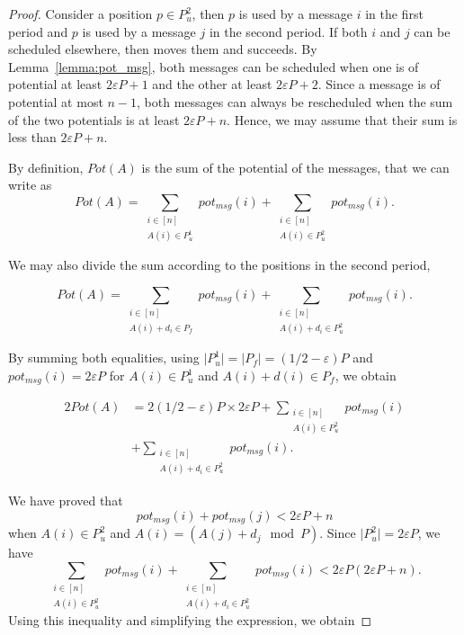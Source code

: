 \documentclass[pdflatex,sn-mathphys,iicol]{sn-jnl}%
\theoremstyle{thmstyleone}%
\theoremstyle{thmstyletwo}%
\theoremstyle{thmstylethree}%
\begin{document}
\begin{proof}
Consider a position $p \in P^2_u$, then $p$ is used by a message $i$ in the first period and $p$ is used by a message $j$ in the second period. If both $i$ and $j$ can be scheduled elsewhere, then \swapandmove moves them and succeeds. 
By Lemma~\ref{lemma:pot_msg}, both messages can be scheduled when one is of potential at least $2\varepsilon P + 1$ and the other at least $2\varepsilon P + 2$. 
Since a message is of potential at most $n-1$, both messages can always be rescheduled when the sum of the two potentials is at least $2\varepsilon P + n$. Hence, we may assume that their sum is less than $2 \varepsilon P + n$. 

By definition, $Pot(A)$ is the sum of the potential of the messages, that we can write as 
$$Pot(A) = \sum_{\substack{i \in [n] \\ A(i) \in P^1_u} } pot_{msg}(i) + \sum_{\substack{i \in [n] \\ A(i) \in P^2_u} } pot_{msg}(i).$$

We may also divide the sum according to the positions in the second period,

$$Pot(A) = \sum_{\substack{i \in [n] \\ A(i) + d_i \in P_f} } pot_{msg}(i) + \sum_{\substack{i \in [n] \\ A(i) + d_i \in P^2_u} } pot_{msg}(i).$$

By summing both equalities, using $\lvert P^1_u\rvert = \lvert P_f\rvert = (1/2 - \varepsilon)P$ and 
$pot_{msg}(i) = 2\varepsilon P$ for $A(i) \in P^1_u$ and  $A(i) + d(i) \in P_f$, we obtain  

\begin{equation*}
  \begin{aligned}
    2Pot(A) & = 2(1/2 - \varepsilon)P \times 2\varepsilon P + \sum_{\substack{i \in [n] \\ A(i) \in P^2_u} } pot_{msg}(i) \\
		  & + \sum_{\substack{i \in [n] \\ A(i) + d_i \in P^2_u} } pot_{msg}(i).
  \end{aligned}
\end{equation*}




We have proved that $$pot_{msg}(i) + pot_{msg}(j) < 2\varepsilon P + n$$ when $A(i) \in P^2_u$ and $A(i) = (A(j) + d_j \mod P)$. Since  $\lvert P^2_u\rvert = 2\varepsilon P$, we have $$\sum_{\substack{i \in [n] \\ A(i) \in P^2_u} } pot_{msg}(i) + \sum_{\substack{i \in [n] \\ A(i) + d_i \in P^2_u} } pot_{msg}(i) < 2\varepsilon P(2\varepsilon P + n).$$
Using this inequality and simplifying the expression, we obtain 



\end{proof}
\end{document}
